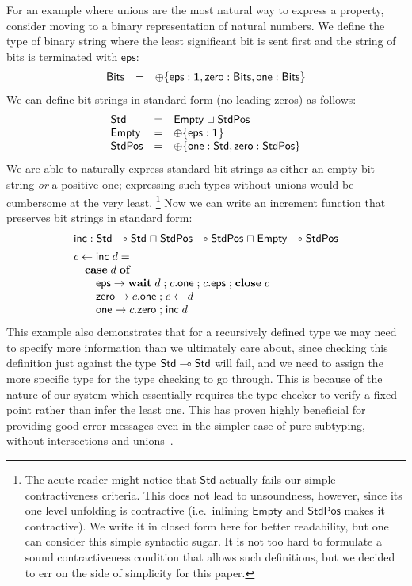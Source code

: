 \documentclass[submission,copyright,creativecommons]{eptcs}
\renewcommand{\intersect}{\mathrel{\sqcap}}
\renewcommand{\union}{\mathrel{\sqcup}}
\newcommand{\m}[1]{\mathsf{#1}}
\newcommand{\mb}[1]{\mbox{\bf #1}}
\newcommand{\semi}{\mathrel{;}}
\begin{document}
For an example where unions are the most natural way to express a property, consider moving to a binary representation of natural numbers. We define the type of binary string where the least significant bit is sent first and the string of bits is terminated with $\m{eps}$:
\[
\begin{array}{lcl}
\m{Bits} & = & \internal\{\m{eps} : \terminate, \m{zero} : \m{Bits}, \m{one} : \m{Bits}\}
\end{array}
\]
We can define bit strings in standard form (no leading zeros) as follows:
\[
\begin{array}{lcl}
\m{Std} & = & \m{Empty} \union \m{StdPos} \\
\m{Empty} & = & \internal\{\m{eps} : \terminate\} \\
\m{StdPos} & = & \internal\{\m{one} : \m{Std}, \m{zero} : \m{StdPos}\}
\end{array}
\]
We are able to naturally express standard bit strings as either an empty bit string \emph{or} a positive one; expressing such types without unions would be cumbersome at the very least.%
\footnote{The acute reader might notice that $\m{Std}$ actually fails our simple contractiveness criteria. This does not lead to unsoundness, however, since its one level unfolding is contractive (i.e.\ inlining $\m{Empty}$ and $\m{StdPos}$ makes it contractive). We write it in closed form here for better readability, but one can consider this simple syntactic sugar. It is not too hard to formulate a sound contractiveness condition that allows such definitions, but we decided to err on the side of simplicity for this paper.}
Now we can write an increment function that preserves bit strings in standard form:
\[
\begin{array}{l}
\m{inc} : \m{Std} \lolli \m{Std} \intersect \m{StdPos} \lolli \m{StdPos} \intersect \m{Empty} \lolli \m{StdPos} \\[1ex]
c \leftarrow \m{inc}\; d = \\
\quad \mb{case}\; d\; \mb{of} \\
\qquad \m{eps} \rightarrow \mb{wait}\; d \semi c.\m{one} \semi c.\m{eps} \semi \mb{close}\; c \\
\qquad \m{zero} \rightarrow c.\m{one} \semi c \leftarrow d \\
\qquad \m{one} \rightarrow c.\m{zero} \semi \m{inc}\; d
\end{array}
\]
This example also demonstrates that for a recursively defined type we may need to specify more information than we ultimately care about, since checking this definition just against the type $\m{Std} \lolli \m{Std}$ will fail, and we need to assign the more specific type for the type checking to go through. This is because of the nature of our system which essentially requires the type checker to verify a fixed point rather than infer the least one. This has proven highly beneficial for providing good error messages even in the simpler case of pure subtyping, without intersections and unions~\cite{Griffith16phd}.
\end{document}
